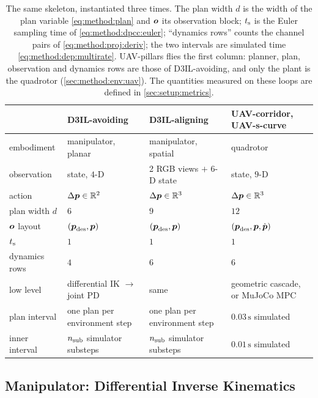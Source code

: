 \begin{table}[htpb]
  \caption[Embodiment instantiation]{The same skeleton, instantiated three times. The plan width $d$
  is the width of the plan variable \eqref{eq:method:plan} and $\vect{o}$ its observation block;
  $t\sidx{s}$ is the Euler sampling time of \eqref{eq:method:dpcc:euler}; ``dynamics rows'' counts the
  channel pairs of \eqref{eq:method:proj:deriv}; the two intervals are simulated time
  \eqref{eq:method:dep:multirate}. UAV-pillars flies the first column: planner, plan, observation and
  dynamics rows are those of D3IL-avoiding, and only the plant is the quadrotor
  (\autoref{sec:method:env:uav}). The quantities measured on these loops are defined in
  \autoref{sec:setup:metrics}.}
  \label{tab:embodiments}
  \centering\small
  \begin{tabularx}{\linewidth}{lLLL}
    \toprule
     & D3IL-avoiding & D3IL-aligning & UAV-corridor, UAV-s-curve \\
    \midrule
    embodiment      & manipulator, planar   & manipulator, spatial      & quadrotor \\
    observation     & state, $4$-D          & 2 RGB views $+$ $6$-D state & state, $9$-D \\
    action          & $\Delta\boldsymbol{p}\in\mathbb{R}^{2}$ & $\Delta\boldsymbol{p}\in\mathbb{R}^{3}$ & $\Delta\boldsymbol{p}\in\mathbb{R}^{3}$ \\
    plan width $d$  & $6$                   & $9$                       & $12$ \\
    $\vect{o}$ layout & $(\boldsymbol{p}_{\textrm{des}},\boldsymbol{p})$ & $(\boldsymbol{p}_{\textrm{des}},\boldsymbol{p})$ & $(\boldsymbol{p}_{\textrm{des}},\boldsymbol{p},\dot{\boldsymbol{p}})$ \\
    $t\sidx{s}$     & $1$                   & $1$                       & $1$ \\
    dynamics rows   & $4$                   & $6$                       & $6$ \\
    low level       & differential \ac{IK} $\rightarrow$ joint PD & same & geometric cascade, or MuJoCo MPC \\
    plan interval   & one plan per environment step & one plan per environment step & $0.03\,\textrm{s}$ simulated \\
    inner interval  & $n_{\textrm{sub}}$ simulator substeps & $n_{\textrm{sub}}$ simulator substeps & $0.01\,\textrm{s}$ simulated \\
    \bottomrule
  \end{tabularx}
\end{table}

\subsection{Manipulator: Differential Inverse Kinematics}\label{sec:method:ik}

